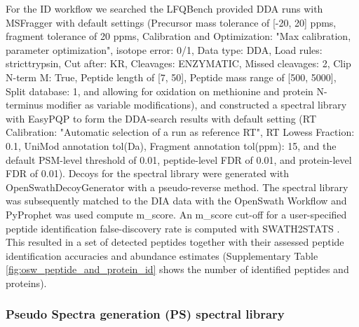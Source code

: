 \documentclass[10pt,letterpaper]{article}
\begin{document}
For the ID workflow we searched the LFQBench provided DDA runs with MSFragger\cite{kong2017msfragger} with default settings (Precursor mass tolerance of [-20, 20] ppms, fragment tolerance of 20 ppms, Calibration and Optimization: "Max calibration, parameter optimization", isotope error: 0/1, Data type: DDA, Load rules: stricttrypsin, Cut after: KR, Cleavages: ENZYMATIC, Missed cleavages: 2, Clip N-term M: True, Peptide length of [7, 50], Peptide mass range of [500, 5000], Split database: 1, and allowing for oxidation on methionine and protein N-terminus modifier as variable modifications), and constructed a spectral library with EasyPQP \cite{easypqp} to form the DDA-search results with default setting (RT Calibration: "Automatic selection of a run as reference RT", RT Lowess Fraction: 0.1, UniMod annotation tol(Da), Fragment annotation tol(ppm): 15, and the default PSM-level threshold of 0.01, peptide-level FDR of 0.01, and protein-level FDR of 0.01). Decoys for the spectral library were generated with OpenSwathDecoyGenerator with a pseudo-reverse method. The spectral library was subsequently matched to the DIA data with the OpenSwath Workflow and PyProphet\cite{teleman2015diana} was used compute m\_score. An m\_score cut-off for a user-specified peptide identification false-discovery rate is computed with SWATH2STATS \cite{blattmann2016swath2stats}. This resulted in a set of detected peptides together with their assessed peptide identification accuracies and abundance estimates (Supplementary Table \ref{fig:osw_peptide_and_protein_id} shows the number of identified peptides and proteins).


\subsubsection*{Pseudo Spectra generation (PS) spectral library}
\end{document}
